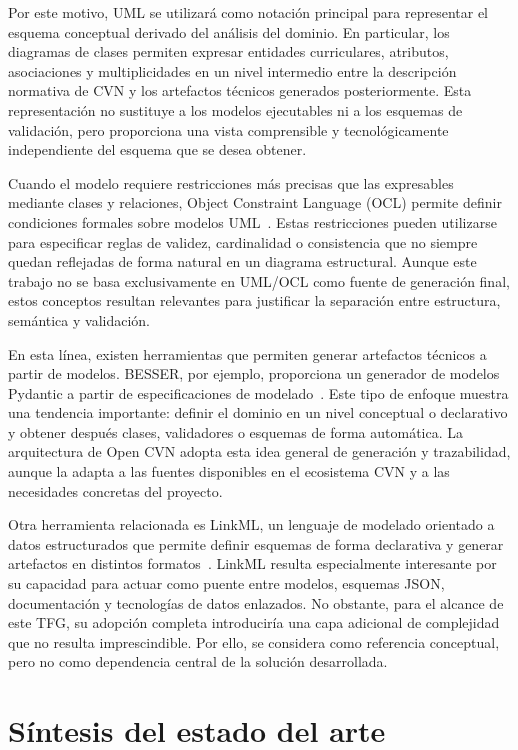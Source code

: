 Por este motivo, UML se utilizará como notación principal para representar el
esquema conceptual derivado del análisis del dominio. En particular, los diagramas
de clases permiten expresar entidades curriculares, atributos, asociaciones y
multiplicidades en un nivel intermedio entre la descripción normativa de CVN y los
artefactos técnicos generados posteriormente. Esta representación no sustituye a
los modelos ejecutables ni a los esquemas de validación, pero proporciona una vista
comprensible y tecnológicamente independiente del esquema que se desea obtener.

Cuando el modelo requiere restricciones más precisas que las expresables mediante
clases y relaciones, Object Constraint Language (OCL) permite definir condiciones
formales sobre modelos UML~\cite{omg_ocl}. Estas restricciones pueden utilizarse
para especificar reglas de validez, cardinalidad o consistencia que no siempre
quedan reflejadas de forma natural en un diagrama estructural. Aunque este trabajo
no se basa exclusivamente en UML/OCL como fuente de generación final, estos
conceptos resultan relevantes para justificar la separación entre estructura,
semántica y validación.

En esta línea, existen herramientas que permiten generar artefactos técnicos a
partir de modelos. BESSER, por ejemplo, proporciona un generador de modelos
Pydantic a partir de especificaciones de modelado~\cite{besser_pydantic}. Este
tipo de enfoque muestra una tendencia importante: definir el dominio en un nivel
conceptual o declarativo y obtener después clases, validadores o esquemas de forma
automática. La arquitectura de Open CVN adopta esta idea general de generación y
trazabilidad, aunque la adapta a las fuentes disponibles en el ecosistema CVN y a
las necesidades concretas del proyecto.

Otra herramienta relacionada es LinkML, un lenguaje de modelado orientado a datos
estructurados que permite definir esquemas de forma declarativa y generar
artefactos en distintos formatos~\cite{linkml_io}. LinkML resulta especialmente
interesante por su capacidad para actuar como puente entre modelos, esquemas JSON,
documentación y tecnologías de datos enlazados. No obstante, para el alcance de
este TFG, su adopción completa introduciría una capa adicional de complejidad que
no resulta imprescindible. Por ello, se considera como referencia conceptual, pero
no como dependencia central de la solución desarrollada.

\section{Síntesis del estado del arte}
\label{sec:estado_arte_sintesis}

